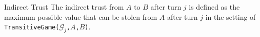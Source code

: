 {}
\begin{definitiongr}{Indirect Trust}
  The indirect trust from $A$ to $B$ after turn $j$ is defined as the maximum possible value that can be stolen from
  $A$ after turn $j$ in the setting of \texttt{TransitiveGame(}$\mathcal{G}_j$\texttt{,}$A$\texttt{,}$B$\texttt{)}.
\end{definitiongr}
